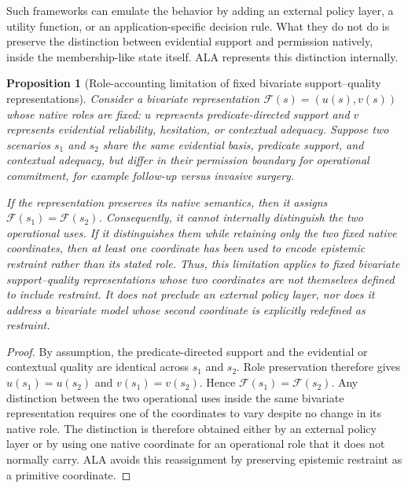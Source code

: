 \documentclass[reqno,final]{amsart}
\theoremstyle{definition}
\theoremstyle{plain}
\newtheorem{proposition}{Proposition}
\theoremstyle{remark}
\begin{document}
Such frameworks can emulate the behavior by adding an external policy layer, a utility function, or an application-specific decision rule. What they do not do is preserve the distinction between evidential support and permission natively, inside the membership-like state itself. ALA represents this distinction internally.

\begin{proposition}[Role-accounting limitation of fixed bivariate support--quality representations]
\label{prop:bivariate_insufficiency}
Consider a bivariate representation \(\mathcal{F}(s)=(u(s),v(s))\) whose native roles are fixed: \(u\) represents predicate-directed support and \(v\) represents evidential reliability, hesitation, or contextual adequacy. Suppose two scenarios \(s_1\) and \(s_2\) share the same evidential basis, predicate support, and contextual adequacy, but differ in their permission boundary for operational commitment, for example follow-up versus invasive surgery.

If the representation preserves its native semantics, then it assigns \(\mathcal{F}(s_1)=\mathcal{F}(s_2)\). Consequently, it cannot internally distinguish the two operational uses. If it distinguishes them while retaining only the two fixed native coordinates, then at least one coordinate has been used to encode epistemic restraint rather than its stated role. Thus, this limitation applies to fixed bivariate support--quality representations whose two coordinates are not themselves defined to include restraint. It does not preclude an external policy layer, nor does it address a bivariate model whose second coordinate is explicitly redefined as restraint.
\end{proposition}

\begin{proof}
By assumption, the predicate-directed support and the evidential or contextual quality are identical across \(s_1\) and \(s_2\). Role preservation therefore gives \(u(s_1)=u(s_2)\) and \(v(s_1)=v(s_2)\). Hence \(\mathcal{F}(s_1)=\mathcal{F}(s_2)\). Any distinction between the two operational uses inside the same bivariate representation requires one of the coordinates to vary despite no change in its native role. The distinction is therefore obtained either by an external policy layer or by using one native coordinate for an operational role that it does not normally carry. ALA avoids this reassignment by preserving epistemic restraint as a primitive coordinate.
\end{proof}
\end{document}
